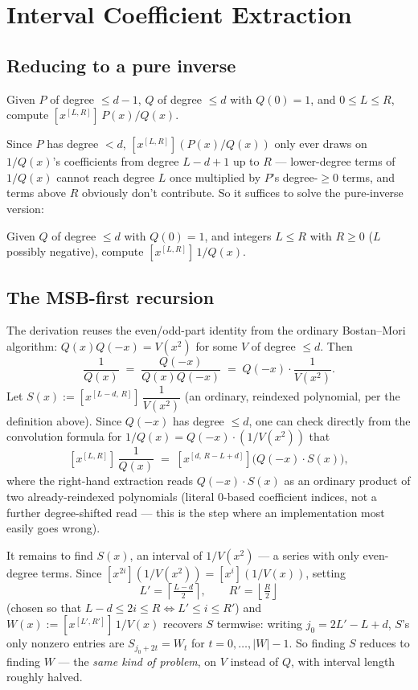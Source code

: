 \documentclass[11pt]{article}
\begin{document}
\section{Interval Coefficient Extraction}

\subsection{Reducing to a pure inverse}
\begin{definitionbox}
Given $P$ of degree $\le d-1$, $Q$ of degree $\le d$ with $Q(0)=1$, and
$0 \le L \le R$, compute $[x^{[L,R]}]\,P(x)/Q(x)$.
\end{definitionbox}

Since $P$ has degree $<d$, $[x^{[L,R]}](P(x)/Q(x))$ only ever draws on
$1/Q(x)$'s coefficients from degree $L-d+1$ up to $R$ --- lower-degree
terms of $1/Q(x)$ cannot reach degree $L$ once multiplied by $P$'s
degree-$\ge 0$ terms, and terms above $R$ obviously don't contribute.
So it suffices to solve the pure-inverse version:

\begin{definitionbox}
Given $Q$ of degree $\le d$ with $Q(0)=1$, and integers $L \le R$ with
$R \ge 0$ ($L$ possibly negative), compute $[x^{[L,R]}]\,1/Q(x)$.
\end{definitionbox}

\subsection{The MSB-first recursion}
The derivation reuses the even/odd-part identity from the ordinary
Bostan--Mori algorithm: $Q(x)Q(-x) = V(x^2)$ for some $V$ of degree
$\le d$. Then
\[
  \frac{1}{Q(x)} \;=\; \frac{Q(-x)}{Q(x)Q(-x)} \;=\; Q(-x)\cdot\frac{1}{V(x^2)}.
\]
Let $S(x) := [x^{[L-d,\,R]}]\,\dfrac{1}{V(x^2)}$ (an ordinary,
reindexed polynomial, per the definition above). Since $Q(-x)$ has degree
$\le d$, one can check directly from the convolution formula for
$1/Q(x)=Q(-x)\cdot(1/V(x^2))$ that
\[
  [x^{[L,R]}]\,\frac{1}{Q(x)} \;=\; [x^{[d,\,R-L+d]}]\bigl(Q(-x)\cdot S(x)\bigr),
\]
where the right-hand extraction reads $Q(-x)\cdot S(x)$ as an ordinary
product of two already-reindexed polynomials (literal $0$-based
coefficient indices, not a further degree-shifted read --- this is the
step where an implementation most easily goes wrong).

It remains to find $S(x)$, an interval of $1/V(x^2)$ --- a series with
only even-degree terms. Since $[x^{2i}](1/V(x^2))=[x^i](1/V(x))$, setting
\[
  L' = \left\lceil \tfrac{L-d}{2} \right\rceil, \qquad
  R' = \left\lfloor \tfrac{R}{2} \right\rfloor
\]
(chosen so that $L-d\le 2i\le R \iff L'\le i\le R'$) and
$W(x):=[x^{[L',R']}]\,1/V(x)$ recovers $S$ termwise: writing
$j_0 = 2L'-L+d$, $S$'s only nonzero entries are
$S_{j_0+2t} = W_t$ for $t=0,\ldots,|W|-1$. So finding $S$ reduces to
finding $W$ --- the \emph{same kind of problem}, on $V$ instead of $Q$,
with interval length roughly halved.
\end{document}
